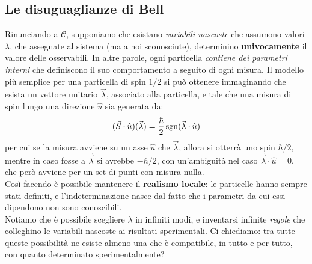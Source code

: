 \documentclass[../../FisicaTeorica.tex]{subfiles}
\begin{document}
\begin{comment}
\section{Lezione X:\\ \large{Paradosso Einstein-Podolski-Rosen (1935) - Parte 2}}
\vspace{-1em}
\begin{center}
    \small{(20/12/2018)}
\end{center}
\end{comment}

\subsection{Le disuguaglianze di Bell}
Rinunciando a $\mathcal{C}$, supponiamo che esistano \textit{variabili nascoste} che assumono valori $\lambda$, che assegnate al sistema (ma a noi sconosciute), determinino \textbf{univocamente} il valore delle osservabili. In altre parole, ogni particella \textit{contiene dei parametri interni} che definiscono il suo comportamento a seguito di ogni misura. Il modello più semplice per una particella di spin $1/2$ si può ottenere immaginando che esista un vettore unitario $\vec{\lambda}$, associato alla particella, e tale che una misura di spin lungo una direzione $\hat{u}$ sia generata da:
\begin{align*}
(\vec{S}\cdot \hat{u})(\vec{\lambda}) = \frac{\hbar}{2}\operatorname{sgn}(\vec{\lambda}\cdot \hat{u})
\end{align*}
per cui se la misura avviene su un asse $\hat{u}$ che  $\vec{\lambda}$, allora si otterrà uno spin $\hbar/2$, mentre in caso fosse  a $\vec{\lambda}$ si avrebbe $-\hbar/2$, con un'ambiguità nel caso $\vec{\lambda}\cdot \hat{u} = 0$, che però avviene per un set di punti con misura nulla.\\

Così facendo è possibile mantenere il \textbf{realismo locale}: le particelle hanno sempre stati definiti, e l'indeterminazione nasce dal fatto che i parametri da cui essi dipendono non sono conoscibili.\\
Notiamo che è possibile scegliere $\lambda$ in infiniti modi, e inventarsi infinite \textit{regole} che colleghino le variabili nascoste ai risultati sperimentali. Ci chiediamo: tra tutte queste possibilità ne esiste almeno una che è compatibile, in tutto e per tutto, con quanto determinato sperimentalmente?\\
\end{document}
